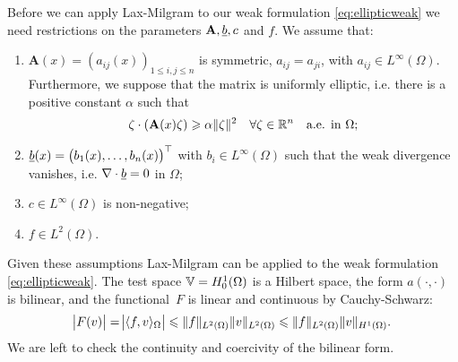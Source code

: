 \documentclass[thesis.tex]{subfiles}
\begin{document}
Before we can apply  Lax-Milgram to our weak formulation \eqref{eq:ellipticweak} we need restrictions on the parameters $\mathbf{A}, \underline{b}, c$ and $f$. We assume that:
\begin{enumerate}[label=(\alph*)]
  \item $\mathbf{A}(x) = (a_{ij}(x))_{1 \leq i,j \leq n}$ is symmetric, $a_{ij} = a_{ji}$, with $a_{ij} \in L^{\infty}(\Omega)$. Furthermore, we suppose that the matrix is uniformly elliptic, i.e. there is a positive constant $\alpha$ such that 
\[
  \zeta \cdot (\mathbf{A}(x) \zeta) \geqslant \alpha \|\zeta\|^2 \quad \forall \zeta \in \mathbb{R}^n \quad \text{a.e. in } \Omega;
\]
\item $\underline{b}(x) = \left(b_1(x), \dots, b_n(x)\right)^\top$ with $b_i \in L^\infty(\Omega)$ such that the weak divergence vanishes, i.e. $\nabla \cdot \underline{b} = 0$ in $\Omega$;
\item $c \in L^\infty(\Omega)$ is non-negative;
\item $f  \in L^2(\Omega)$.
\end{enumerate}
Given these assumptions Lax-Milgram can be applied to the weak formulation \eqref{eq:ellipticweak}. The test space $\mathbb{V} = H_0^1(\Omega)$ is
a Hilbert space, the form $a(\cdot, \cdot)$ is bilinear, and the functional~$F$ is linear and continuous by Cauchy-Schwarz:
\[
\abs{F(v)} = \abs{\langle f,v \rangle_\Omega} \leqslant \|f\|_{L^2(\Omega)} \|v\|_{L^2(\Omega)} \leqslant \|f\|_{L^2(\Omega)} \|v\|_{H^1(\Omega)}.
\]
We are left to check the continuity and coercivity of the bilinear form.
\end{document}
